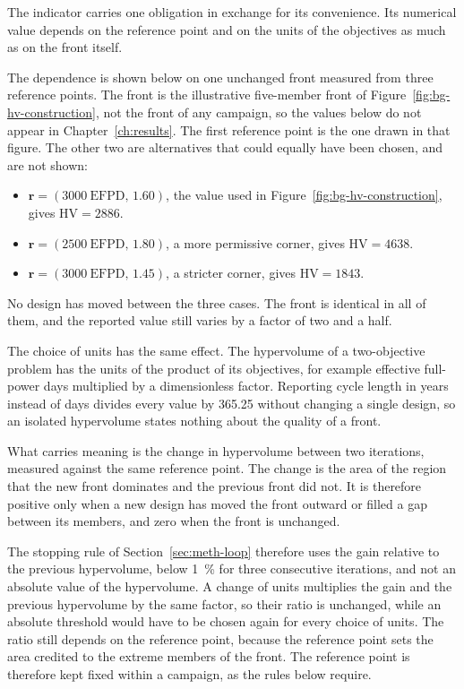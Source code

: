 The indicator carries one obligation in exchange for its convenience.
Its numerical value depends on the reference point and on the units of
the objectives as much as on the front itself.

The dependence is shown below on one unchanged front measured from three
reference points. The front is the illustrative five-member front of
Figure~\ref{fig:bg-hv-construction}, not the front of any campaign, so
the values below do not appear in Chapter~\ref{ch:results}. The first
reference point is the one drawn in that figure. The other two are
alternatives that could
equally have been chosen, and are not shown:

\begin{itemize}
  \item $\mathbf{r} = (3000~\mathrm{EFPD},\, 1.60)$, the value used in
        Figure~\ref{fig:bg-hv-construction}, gives
        $\mathrm{HV} = 2886$.

  \item $\mathbf{r} = (2500~\mathrm{EFPD},\, 1.80)$, a more permissive
        corner, gives $\mathrm{HV} = 4638$.

  \item $\mathbf{r} = (3000~\mathrm{EFPD},\, 1.45)$, a stricter corner,
        gives $\mathrm{HV} = 1843$.
\end{itemize}

No design has moved between the three cases. The front is identical in
all of them, and the reported value still varies by a factor of two and
a half.

The choice of units has the same effect. The hypervolume of a
two-objective problem has the units of the product of its objectives,
for example effective full-power days multiplied by a dimensionless
factor. Reporting cycle length in years instead of days divides every
value by 365.25 without changing a single design, so an isolated
hypervolume states nothing about the quality of a front.

What carries meaning is the change in hypervolume between two
iterations, measured against the same reference point. The change is
the area of the region that the new front dominates and the previous
front did not. It is therefore positive only when a new design has moved
the front outward or filled a gap between its members, and zero when
the front is unchanged.

The stopping rule of Section~\ref{sec:meth-loop} therefore uses the gain
relative to the previous hypervolume, below \SI{1}{\percent} for three
consecutive iterations, and not an absolute value of the hypervolume. A
change of units multiplies the gain and the previous hypervolume by the
same factor, so their ratio is unchanged, while an absolute threshold
would have to be chosen again for every choice of units. The ratio still
depends on the reference point, because the reference point sets the
area credited to the extreme members of the front. The reference point
is therefore kept fixed within a campaign, as the rules below require.

